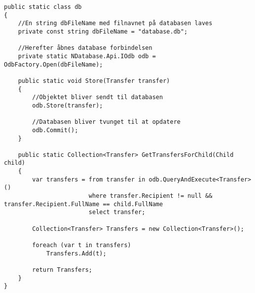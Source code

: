 \begin{lstlisting}[caption={Uddrag af filen "db.cs" fra kildekoden til programmet},label={lst:db}]
public static class db
{
	//En string dbFileName med filnavnet på databasen laves
	private const string dbFileName = "database.db";
	
	//Herefter åbnes database forbindelsen
	private static NDatabase.Api.IOdb odb = OdbFactory.Open(dbFileName);

	public static void Store(Transfer transfer)
	{
		//Objektet bliver sendt til databasen
		odb.Store(transfer);
		
		//Databasen bliver tvunget til at opdatere
		odb.Commit();
	}
	
	public static Collection<Transfer> GetTransfersForChild(Child child)
	{
		var transfers = from transfer in odb.QueryAndExecute<Transfer>()
						where transfer.Recipient != null && transfer.Recipient.FullName == child.FullName
						select transfer;

		Collection<Transfer> Transfers = new Collection<Transfer>();

		foreach (var t in transfers)
			Transfers.Add(t);

		return Transfers;
	}
}
\end{lstlisting}

